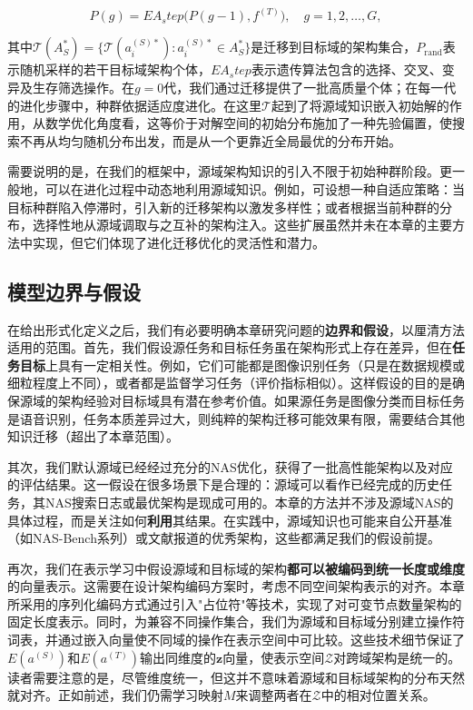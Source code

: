 \documentclass[../main.tex]{subfiles}
\begin{document}
\begin{equation}
	P(g) = EA_step\big(P(g-1), f^{(T)}\big), \quad g=1,2,\dots,G,
\end{equation}

其中$\mathcal{T}(A^*_S) = \{\mathcal{T}(a^{(S)*}_i): a^{(S)*}_i \in A^*_S\}$是迁移到目标域的架构集合，$P_{\text{rand}}$表示随机采样的若干目标域架构个体，$EA_step$表示遗传算法包含的选择、交叉、变异及生存筛选操作。在$g=0$代，我们通过迁移提供了一批高质量个体；在每一代的进化步骤中，种群依据适应度进化。在这里$\mathcal{T}$起到了将源域知识嵌入初始解的作用，从数学优化角度看，这等价于对解空间的初始分布施加了一种先验偏置，使搜索不再从均匀随机分布出发，而是从一个更靠近全局最优的分布开始。

需要说明的是，在我们的框架中，源域架构知识的引入不限于初始种群阶段。更一般地，可以在进化过程中动态地利用源域知识。例如，可设想一种自适应策略：当目标种群陷入停滞时，引入新的迁移架构以激发多样性；或者根据当前种群的分布，选择性地从源域调取与之互补的架构注入。这些扩展虽然并未在本章的主要方法中实现，但它们体现了进化迁移优化的灵活性和潜力。

\subsection{模型边界与假设}

在给出形式化定义之后，我们有必要明确本章研究问题的\textbf{边界和假设}，以厘清方法适用的范围。首先，我们假设源任务和目标任务虽在架构形式上存在差异，但在\textbf{任务目标}上具有一定相关性。例如，它们可能都是图像识别任务（只是在数据规模或细粒程度上不同），或者都是监督学习任务（评价指标相似）。这样假设的目的是确保源域的架构经验对目标域具有潜在参考价值。如果源任务是图像分类而目标任务是语音识别，任务本质差异过大，则纯粹的架构迁移可能效果有限，需要结合其他知识迁移（超出了本章范围）。

其次，我们默认源域已经经过充分的NAS优化，获得了一批高性能架构以及对应的评估结果。这一假设在很多场景下是合理的：源域可以看作已经完成的历史任务，其NAS搜索日志或最优架构是现成可用的。本章的方法并不涉及源域NAS的具体过程，而是关注如何\textbf{利用}其结果。在实践中，源域知识也可能来自公开基准（如NAS-Bench系列）或文献报道的优秀架构，这些都满足我们的假设前提。

再次，我们在表示学习中假设源域和目标域的架构\textbf{都可以被编码到统一长度或维度}的向量表示。这需要在设计架构编码方案时，考虑不同空间架构表示的对齐。本章所采用的序列化编码方式通过引入"占位符"等技术，实现了对可变节点数量架构的固定长度表示。同时，为兼容不同操作集合，我们为源域和目标域分别建立操作符词表，并通过嵌入向量使不同域的操作在表示空间中可比较。这些技术细节保证了$E(a^{(S)})$和$E(a^{(T)})$输出同维度的$\mathbf{z}$向量，使表示空间$\mathcal{Z}$对跨域架构是统一的。读者需要注意的是，尽管维度统一，但这并不意味着源域和目标域架构的分布天然就对齐。正如前述，我们仍需学习映射$M$来调整两者在$\mathcal{Z}$中的相对位置关系。
\end{document}
